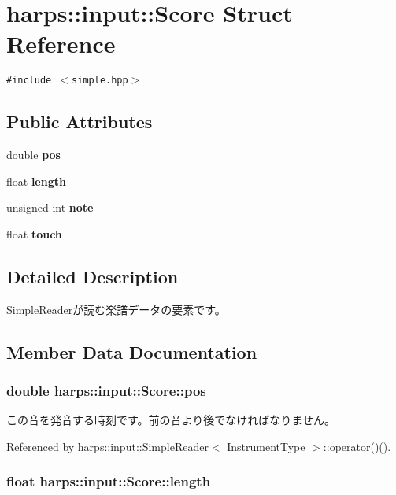 \section{harps::input::Score Struct Reference}
\label{structharps_1_1input_1_1Score}
{\tt \#include $<$simple.hpp$>$}

\subsection*{Public Attributes}
\begin{CompactItemize}
\item 
double {\bf pos}
\item 
float {\bf length}
\item 
unsigned int {\bf note}
\item 
float {\bf touch}
\end{CompactItemize}


\subsection{Detailed Description}
SimpleReaderが読む楽譜データの要素です。 

\subsection{Member Data Documentation}
\subsubsection[pos]{\setlength{\rightskip}{0pt plus 5cm}double {\bf harps::input::Score::pos}}\label{structharps_1_1input_1_1Score_e17864694bc7d1f6c4842919867ad53f}


この音を発音する時刻です。前の音より後でなければなりません。 

Referenced by harps::input::SimpleReader$<$ InstrumentType $>$::operator()().
\subsubsection[length]{\setlength{\rightskip}{0pt plus 5cm}float {\bf harps::input::Score::length}}\label{structharps_1_1input_1_1Score_3f9a1a8c50a874834877751a8d1dabe5}


